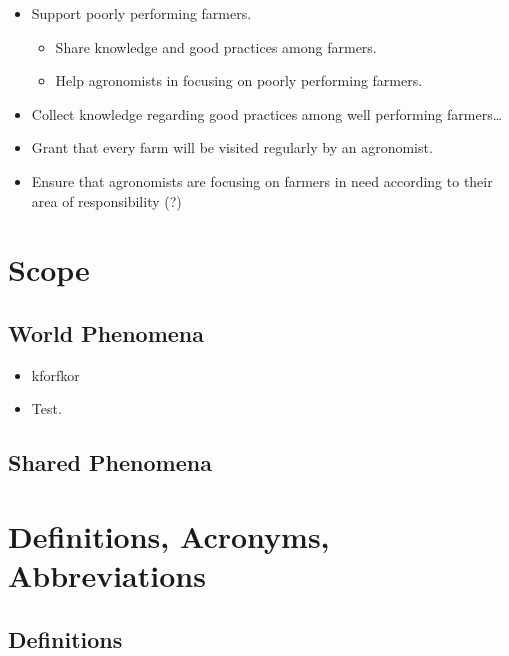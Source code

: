 \begin{itemize}
    
    
    \item Support poorly performing farmers.
    \begin{itemize}
        \item Share knowledge and good practices among farmers.
        \item Help agronomists in focusing on poorly performing farmers.
    \end{itemize}
    \item Collect knowledge regarding good practices among well performing farmers\dots
    \item Grant that every farm will be visited regularly by an agronomist. 
    \item Ensure that agronomists are focusing on farmers in need according to their area of responsibility (?)

        
\end{itemize}

\section{Scope}

\subsection{World Phenomena}

\begin{itemize}%
    \item kforfkor
    \item Test.
\end{itemize}

\subsection{Shared Phenomena}


\section{Definitions, Acronyms, Abbreviations}

\subsection{Definitions}

